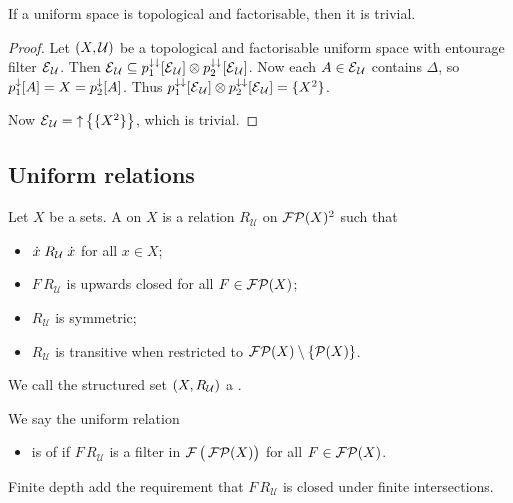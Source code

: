 \begin{proposition}
If a uniform space is topological and factorisable, then it is trivial.
\end{proposition}
\begin{proof}
Let $\sSet{X,\mathcal{U}}$ be a topological and factorisable uniform space with entourage filter $\operatorname{\mathcal{E}}_\mathcal{U}$. Then $\operatorname{\mathcal{E}}_\mathcal{U} \subseteq p_1^{\downarrow\downarrow}[\operatorname{\mathcal{E}}_\mathcal{U}]\otimes p_2^{\downarrow\downarrow}[\operatorname{\mathcal{E}}_\mathcal{U}]$. Now each $A\in \operatorname{\mathcal{E}}_\mathcal{U}$ contains $\Delta$, so $p_1^\downarrow[A] = X = p_2^\downarrow[A]$. Thus $p_1^{\downarrow\downarrow}[\operatorname{\mathcal{E}}_\mathcal{U}]\otimes p_2^{\downarrow\downarrow}[\operatorname{\mathcal{E}}_\mathcal{U}] = \{X^2\}$.

Now $\operatorname{\mathcal{E}}_\mathcal{U} = \operatorname{\uparrow}\big\{\{X^2\}\big\}$, which is trivial.
\end{proof}

\subsection{Uniform relations}
\begin{definition}
Let $X$ be a sets. A  on $X$ is a relation $R_\mathcal{U}$ on $\operatorname{\mathcal{FP}}(X)^2$ such that
\begin{itemize}
\item $\dot{x}\mathrel{R_\mathcal{U}}\dot{x}$ for all $x\in X$;
\item $F\,R_\mathcal{U}$ is upwards closed for all $F\in \operatorname{\mathcal{FP}}(X)$;
\item $R_\mathcal{U}$ is symmetric;
\item $R_\mathcal{U}$ is transitive when restricted to $\operatorname{\mathcal{FP}}(X)\setminus\{\operatorname{\mathcal{P}}(X)\}$.
\end{itemize}
We call the structured set $\sSet{X,R_\mathcal{U}}$ a .

We say the uniform relation
\begin{itemize}
\item  is of  if $F\,R_\mathcal{U}$ is a filter in $\operatorname{\mathcal{F}}\big(\operatorname{\mathcal{FP}}(X)\big)$ for all $F\in \operatorname{\mathcal{FP}}(X)$.
\end{itemize}
\end{definition}
Finite depth add the requirement that $F\,R_\mathcal{U}$ is closed under finite intersections.

